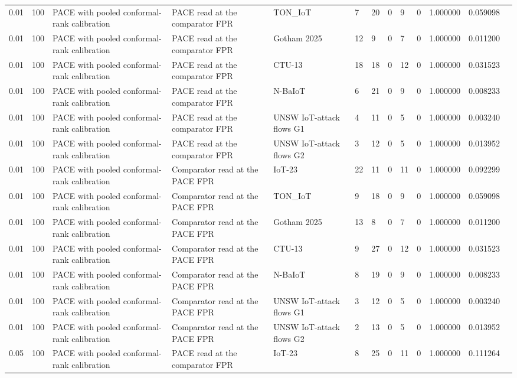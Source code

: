 \begin{tabular}{lllllllllllll}
0.01 & 100 & PACE with pooled conformal-rank calibration & PACE read at the comparator FPR & TON\_IoT & 7 & 20 & 0 & 9 & 0 & 1.000000 & 0.059098 &  \\
0.01 & 100 & PACE with pooled conformal-rank calibration & PACE read at the comparator FPR & Gotham 2025 & 12 & 9 & 0 & 7 & 0 & 1.000000 & 0.011200 &  \\
0.01 & 100 & PACE with pooled conformal-rank calibration & PACE read at the comparator FPR & CTU-13 & 18 & 18 & 0 & 12 & 0 & 1.000000 & 0.031523 &  \\
0.01 & 100 & PACE with pooled conformal-rank calibration & PACE read at the comparator FPR & N-BaIoT & 6 & 21 & 0 & 9 & 0 & 1.000000 & 0.008233 &  \\
0.01 & 100 & PACE with pooled conformal-rank calibration & PACE read at the comparator FPR & UNSW IoT-attack flows G1 & 4 & 11 & 0 & 5 & 0 & 1.000000 & 0.003240 &  \\
0.01 & 100 & PACE with pooled conformal-rank calibration & PACE read at the comparator FPR & UNSW IoT-attack flows G2 & 3 & 12 & 0 & 5 & 0 & 1.000000 & 0.013952 &  \\
0.01 & 100 & PACE with pooled conformal-rank calibration & Comparator read at the PACE FPR & IoT-23 & 22 & 11 & 0 & 11 & 0 & 1.000000 & 0.092299 &  \\
0.01 & 100 & PACE with pooled conformal-rank calibration & Comparator read at the PACE FPR & TON\_IoT & 9 & 18 & 0 & 9 & 0 & 1.000000 & 0.059098 &  \\
0.01 & 100 & PACE with pooled conformal-rank calibration & Comparator read at the PACE FPR & Gotham 2025 & 13 & 8 & 0 & 7 & 0 & 1.000000 & 0.011200 &  \\
0.01 & 100 & PACE with pooled conformal-rank calibration & Comparator read at the PACE FPR & CTU-13 & 9 & 27 & 0 & 12 & 0 & 1.000000 & 0.031523 &  \\
0.01 & 100 & PACE with pooled conformal-rank calibration & Comparator read at the PACE FPR & N-BaIoT & 8 & 19 & 0 & 9 & 0 & 1.000000 & 0.008233 &  \\
0.01 & 100 & PACE with pooled conformal-rank calibration & Comparator read at the PACE FPR & UNSW IoT-attack flows G1 & 3 & 12 & 0 & 5 & 0 & 1.000000 & 0.003240 &  \\
0.01 & 100 & PACE with pooled conformal-rank calibration & Comparator read at the PACE FPR & UNSW IoT-attack flows G2 & 2 & 13 & 0 & 5 & 0 & 1.000000 & 0.013952 &  \\
0.05 & 100 & PACE with pooled conformal-rank calibration & PACE read at the comparator FPR & IoT-23 & 8 & 25 & 0 & 11 & 0 & 1.000000 & 0.111264 &  \\

\end{tabular}
